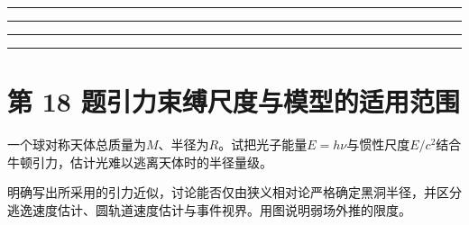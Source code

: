 \documentclass[UTF8,fontset=fandol,a4paper,11pt]{ctexart}
\newcommand{\workarea}{\par\vspace{7mm}\noindent{\small\color{muted}作答区}\par\vspace{4mm}
\noindent\textcolor{rulegray}{\rule{\linewidth}{0.3pt}}\par\vspace{16mm}
\noindent\textcolor{rulegray}{\rule{\linewidth}{0.3pt}}\par\vspace{16mm}
\noindent\textcolor{rulegray}{\rule{\linewidth}{0.3pt}}\par\vspace{16mm}
\noindent\textcolor{rulegray}{\rule{\linewidth}{0.3pt}}}
\begin{document}
\workarea

\clearpage


\section*{第 18 题\quad 引力束缚尺度与模型的适用范围}\label{q:18}

一个球对称天体总质量为$M$、半径为$R$。试把光子能量$E=h\nu$与惯性尺度$E/c^2$结合牛顿引力，估计光难以逃离天体时的半径量级。

明确写出所采用的引力近似，讨论能否仅由狭义相对论严格确定黑洞半径，并区分逃逸速度估计、圆轨道速度估计与事件视界。用图说明弱场外推的限度。

\begin{center}\begin{minipage}{.98\linewidth}\centering
\begin{tikzpicture}[scale=.9,transform shape]

\end{tikzpicture}
\end{minipage}
\end{center}
\end{document}
